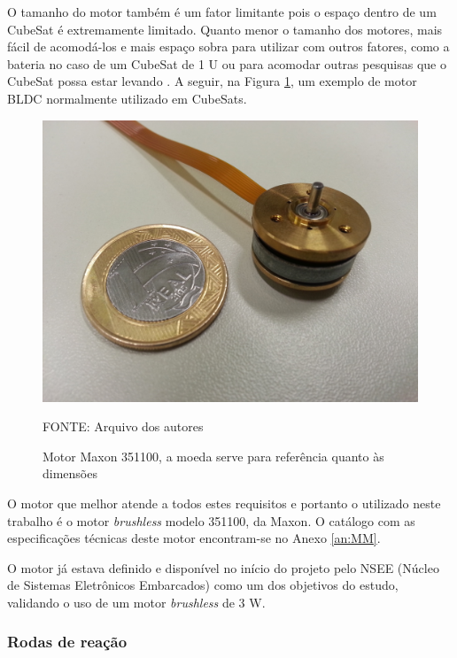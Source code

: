 \documentclass[
	12pt,				%
	openany,			%
	twoside,			%
	a4paper,			%
	english,			%
	french,				%
	spanish,			%
	brazil,				%
	oldfontcommands
	]{abntex2}
\begin{document}

O tamanho do motor também é um fator limitante pois o espaço dentro de um CubeSat é extremamente limitado. Quanto menor o tamanho dos motores, mais fácil de acomodá-los e mais espaço sobra para utilizar com outros fatores, como a bateria no caso de um CubeSat de 1 U ou para acomodar outras pesquisas que o CubeSat possa estar levando \cite{Martins}. A seguir, na Figura \ref{fig:Maxon}, um exemplo de motor BLDC normalmente utilizado em CubeSats.

\begin{figure}[th]
	\caption{Motor Maxon 351100, a moeda serve para referência quanto às dimensões}
	\centering
	\includegraphics[width=0.8\linewidth]{./figs/Maxon_351100}
	
	\begin{small}
		FONTE: Arquivo dos autores
	\end{small}
	\label{fig:Maxon}
\end{figure}

\newpage

O motor que melhor atende a todos estes requisitos e portanto o utilizado neste trabalho é o motor \textit{brushless} modelo 351100, da Maxon. O catálogo com as especificações técnicas deste motor encontram-se no Anexo \ref{an:MM}.

O motor já estava definido e disponível no início do projeto pelo NSEE (Núcleo de Sistemas Eletrônicos Embarcados) como um dos objetivos do estudo, validando o uso de um motor \textit{brushless} de 3 W.

\subsubsection{Rodas de reação}
\end{document}
